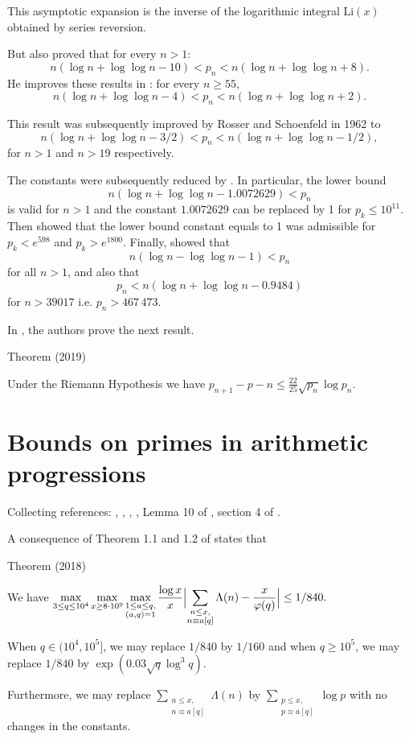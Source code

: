This asymptotic expansion is the inverse of the logarithmic integral
$\mbox{Li}(x)$ obtained by series reversion. 


 But
\cite{Rosser*38}
also proved  that for every $n> 1$:
$$
n (\log n + \log \log n - 10) < p_n < n (\log n + \log\log n +8).
$$
He improves these results in
\cite{Rosser*41}
:  for every $n\geq 55$,
$$
n (\log n + \log \log n - 4) < p_n < n (\log n + \log\log n +2).
$$

 This result was subsequently improved by Rosser and Schoenfeld
\cite{Rosser-Schoenfeld*62}
 in 1962 to
$$
n (\log n + \log \log n - 3/2) < p_n < n (\log n + \log\log n -1/2),
$$
for $n > 1$ and $n > 19$  respectively.

The constants  were subsequently reduced by
\cite{Robin*83-1}.
In particular, the lower bound 
$$
n (\log n + \log \log n - 1.0072629) < p_n
$$
is valid for $n>1$ and the constant $1.0072629$ can be replaced by 1 for
$p_k\leq 10^{11}$.
Then 
\cite{Massias-Robin*96}
  showed that the lower bound constant equals to 1 was admissible for
$p_k < e^{598}$
and $p_k > e^{1800}$. Finally,  
\cite{Dusart*99-2}
showed
that
$$
  n(\log n - \log \log n - 1) < p_n
$$ for all $n > 1$, and also that
$$
p_n < n (\log n + \log\log n - 0.9484)
$$ for $n > 39017$ i.e. $p_n > 467\,473$.

In \cite{Carneiro-Milinovich-Soundararajan*19}, the authors  prove the next result.
\begin{thm}{Theorem (2019)}

Under the Riemann Hypothesis we have $p_{n+1}-p-n\le\frac{22}{25}\sqrt{p_n}\log p_n$.
\end{thm}




\section{Bounds on primes in arithmetic progressions}


Collecting references:
\cite{McCurley*84-2},
\cite{McCurley*84-3},
\cite{Ramare-Rumely*96},
\cite{Dusart*01},
Lemma 10 of \cite{Moree*04},
section 4 of
\cite{Moree-teRiele*04}.

A consequence of Theorem 1.1 and 1.2 of
\cite{Bennett-Martin-OBryant-Rechnitzer*18}
states that
\begin{thm}{Theorem (2018)}

  We have
  $\displaystyle
  \max_{3\le q\le 10^4}\max_{ x\ge 8\cdot 10^9}\max_{\substack{1\le a\le q,\\
  (a,q)=1}}
  \frac{\log x}{x}\Bigl|
  \sum_{\substack{n\le x,\\ n\equiv a[q]}}\Lambda(n)
  -\frac{x}{\varphi(q)}\Bigr|\le 1/840.
  $
  \par 
  When $q\in(10^4, 10^5]$, we may replace $1/840$ by $1/160$ and when
  $q\ge 10^5$, we may replace $1/840$ by $\exp(0.03\sqrt{q}\log^3q)$.
  \par 
    Furthermore, we may replace
  $\sum_{\substack{n\le x,\\ n\equiv a[q]}}\Lambda(n)$ by
  $\sum_{\substack{p\le x,\\ p\equiv a[q]}}\log p$ with no changes in
  the constants. 
\end{thm}

